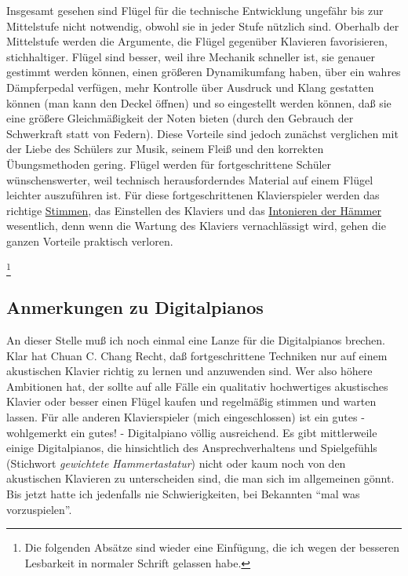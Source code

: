 Insgesamt gesehen sind Flügel für die technische Entwicklung ungefähr bis zur Mittelstufe nicht notwendig, obwohl sie in jeder Stufe nützlich sind.
Oberhalb der Mittelstufe werden die Argumente, die Flügel gegenüber Klavieren favorisieren, stichhaltiger.
Flügel sind besser, weil ihre Mechanik schneller ist, sie genauer gestimmt werden können, einen größeren Dynamikumfang haben, über ein wahres Dämpferpedal verfügen, mehr Kontrolle über Ausdruck und Klang gestatten können (man kann den Deckel öffnen) und so eingestellt werden können, daß sie eine größere Gleichmäßigkeit der Noten bieten (durch den Gebrauch der Schwerkraft statt von Federn).
Diese Vorteile sind jedoch zunächst verglichen mit der Liebe des Schülers zur Musik, seinem Fleiß und den korrekten Übungsmethoden gering.
Flügel werden für fortgeschrittene Schüler wünschenswerter, weil technisch herausforderndes Material auf einem Flügel leichter auszuführen ist.
Für diese fortgeschrittenen Klavierspieler werden das richtige \hyperlink{c2_1}{Stimmen}, das Einstellen des Klaviers und das \hyperlink{c2_7_hamm}{Intonieren der Hämmer} wesentlich, denn wenn die Wartung des Klaviers vernachlässigt wird, gehen die ganzen Vorteile praktisch verloren.
 

\hypertarget{c1iii17g}{}
\hypertarget{digital}{}

\footnote{Die folgenden Absätze sind wieder eine Einfügung, die ich wegen der besseren Lesbarkeit in normaler Schrift gelassen habe.}


\subsection{Anmerkungen zu Digitalpianos}

An dieser Stelle muß ich noch einmal eine Lanze für die Digitalpianos brechen.
Klar hat Chuan C. Chang Recht, daß fortgeschrittene Techniken nur auf einem akustischen Klavier richtig zu lernen und anzuwenden sind.
Wer also höhere Ambitionen hat, der sollte auf alle Fälle ein qualitativ hochwertiges akustisches Klavier oder besser einen Flügel kaufen und regelmäßig stimmen und warten lassen.
Für alle anderen Klavierspieler (mich eingeschlossen) ist ein gutes - wohlgemerkt ein gutes! - Digitalpiano völlig ausreichend.
Es gibt mittlerweile einige Digitalpianos, die hinsichtlich des Ansprechverhaltens und Spielgefühls (Stichwort \textit{gewichtete Hammertastatur}) nicht oder kaum noch von den akustischen Klavieren zu unterscheiden sind, die man sich im allgemeinen gönnt.
Bis jetzt hatte ich jedenfalls nie Schwierigkeiten, bei Bekannten \enquote{mal was vorzuspielen}.

